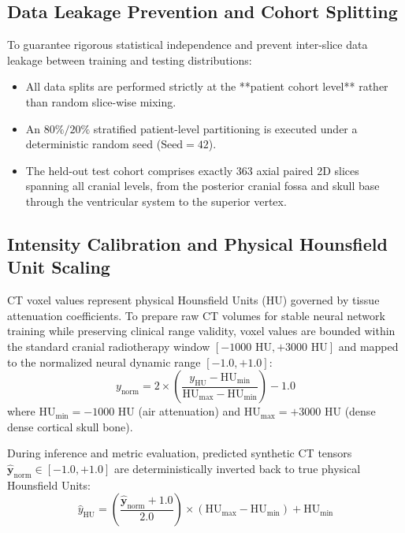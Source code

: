 \subsection{Data Leakage Prevention and Cohort Splitting}
To guarantee rigorous statistical independence and prevent inter-slice data leakage between training and testing distributions:
\begin{itemize}
    \item All data splits are performed strictly at the **patient cohort level** rather than random slice-wise mixing.
    \item An $80\% / 20\%$ stratified patient-level partitioning is executed under a deterministic random seed ($\text{Seed} = 42$).
    \item The held-out test cohort comprises exactly 363 axial paired 2D slices spanning all cranial levels, from the posterior cranial fossa and skull base through the ventricular system to the superior vertex.
\end{itemize}

\subsection{Intensity Calibration and Physical Hounsfield Unit Scaling}
CT voxel values represent physical Hounsfield Units (HU) governed by tissue attenuation coefficients. To prepare raw CT volumes for stable neural network training while preserving clinical range validity, voxel values are bounded within the standard cranial radiotherapy window $[-1000\text{ HU}, +3000\text{ HU}]$ and mapped to the normalized neural dynamic range $[-1.0, +1.0]$:
\begin{equation}
y_{\text{norm}} = 2 \times \left( \frac{y_{\text{HU}} - \text{HU}_{\min}}{\text{HU}_{\max} - \text{HU}_{\min}} \right) - 1.0
\label{eq:ct_norm_forward}
\end{equation}
where $\text{HU}_{\min} = -1000\text{ HU}$ (air attenuation) and $\text{HU}_{\max} = +3000\text{ HU}$ (dense dense cortical skull bone).

During inference and metric evaluation, predicted synthetic CT tensors $\mathbf{\hat{y}}_{\text{norm}} \in [-1.0, +1.0]$ are deterministically inverted back to true physical Hounsfield Units:
\begin{equation}
\hat{y}_{\text{HU}} = \left( \frac{\mathbf{\hat{y}}_{\text{norm}} + 1.0}{2.0} \right) \times (\text{HU}_{\max} - \text{HU}_{\min}) + \text{HU}_{\min}
\label{eq:ct_norm_inverse}
\end{equation}

